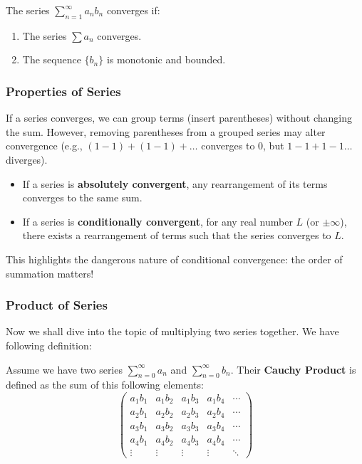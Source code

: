 \begin{theorem}
The series $\sum_{n=1}^{\infty} a_n b_n$ converges if:
\begin{enumerate}
    \item The series $\sum a_n$ converges.
    \item The sequence $\{b_n\}$ is monotonic and bounded.
\end{enumerate}
\end{theorem}

\subsubsection{Properties of Series}

\begin{theorem}[Associativity]
If a series converges, we can group terms (insert parentheses) without changing the sum. However, removing parentheses from a grouped series may alter convergence (e.g., $(1-1)+(1-1)+\dots$ converges to 0, but $1-1+1-1\dots$ diverges).
\end{theorem}

\begin{theorem}
\begin{itemize}
    \item If a series is \textbf{absolutely convergent}, any rearrangement of its terms converges to the same sum.
    \item If a series is \textbf{conditionally convergent}, for any real number $L$ (or $\pm \infty$), there exists a rearrangement of terms such that the series converges to $L$.
\end{itemize}
This highlights the dangerous nature of conditional convergence: the order of summation matters!
\end{theorem}

\subsubsection{Product of Series}
Now we shall dive into the topic of multiplying two series together. We have following definition:

\begin{definition}
    Assume we have two series $\sum_{n=0}^{\infty} a_n$ and $\sum_{n=0}^{\infty} b_n$. Their \textbf{Cauchy Product} is defined as the sum of this following elements:
    \[\begin{pmatrix}
        a_1 b_1 & a_1 b_2 & a_1 b_3 & a_1 b_4 & \cdots \\
        a_2 b_1 & a_2 b_2 & a_2 b_3 & a_2 b_4 & \cdots \\
        a_3 b_1 & a_3 b_2 & a_3 b_3 & a_3 b_4 & \cdots \\
        a_4 b_1 & a_4 b_2 & a_4 b_3 & a_4 b_4 & \cdots \\
    \vdots   & \vdots   & \vdots   & \vdots   & \ddots
    \end{pmatrix}\]
\end{definition}

